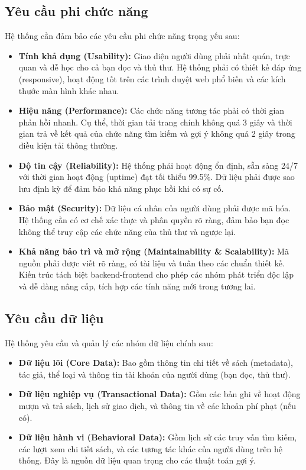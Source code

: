 \subsection{Yêu cầu phi chức năng}
\label{subsec:YeuCauPhiChucNang}
Hệ thống cần đảm bảo các yêu cầu phi chức năng trọng yếu sau:
\begin{itemize}
    \item \textbf{Tính khả dụng (Usability):} Giao diện người dùng phải nhất quán, trực quan và dễ học cho cả bạn đọc và thủ thư. Hệ thống phải có thiết kế đáp ứng (responsive), hoạt động tốt trên các trình duyệt web phổ biến và các kích thước màn hình khác nhau.
    
    \item \textbf{Hiệu năng (Performance):} Các chức năng tương tác phải có thời gian phản hồi nhanh. Cụ thể, thời gian tải trang chính không quá 3 giây và thời gian trả về kết quả của chức năng tìm kiếm và gợi ý không quá 2 giây trong điều kiện tải thông thường.
    
    \item \textbf{Độ tin cậy (Reliability):} Hệ thống phải hoạt động ổn định, sẵn sàng 24/7 với thời gian hoạt động (uptime) đạt tối thiểu 99.5\%. Dữ liệu phải được sao lưu định kỳ để đảm bảo khả năng phục hồi khi có sự cố.
    
    \item \textbf{Bảo mật (Security):} Dữ liệu cá nhân của người dùng phải được mã hóa. Hệ thống cần có cơ chế xác thực và phân quyền rõ ràng, đảm bảo bạn đọc không thể truy cập các chức năng của thủ thư và ngược lại.
    
    \item \textbf{Khả năng bảo trì và mở rộng (Maintainability \& Scalability):} Mã nguồn phải được viết rõ ràng, có tài liệu và tuân theo các chuẩn thiết kế. Kiến trúc tách biệt backend-frontend cho phép các nhóm phát triển độc lập và dễ dàng nâng cấp, tích hợp các tính năng mới trong tương lai.
\end{itemize}

\subsection{Yêu cầu dữ liệu}
\label{subsec:YeuCauDuLieu}
Hệ thống yêu cầu và quản lý các nhóm dữ liệu chính sau:
\begin{itemize}
    \item \textbf{Dữ liệu lõi (Core Data):} Bao gồm thông tin chi tiết về sách (metadata), tác giả, thể loại và thông tin tài khoản của người dùng (bạn đọc, thủ thư).
    
    \item \textbf{Dữ liệu nghiệp vụ (Transactional Data):} Gồm các bản ghi về hoạt động mượn và trả sách, lịch sử giao dịch, và thông tin về các khoản phí phạt (nếu có).
    
    \item \textbf{Dữ liệu hành vi (Behavioral Data):} Gồm lịch sử các truy vấn tìm kiếm, các lượt xem chi tiết sách, và các tương tác khác của người dùng trên hệ thống. Đây là nguồn dữ liệu quan trọng cho các thuật toán gợi ý.
\end{itemize}


